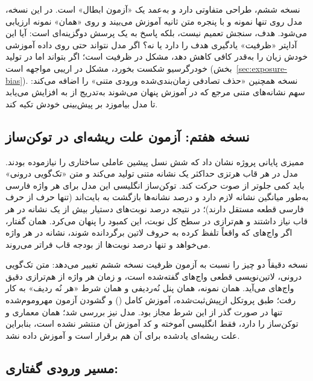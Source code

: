 نسخه ششم، طراحی متفاوتی دارد و به‌عمد یک «آزمون ابطال» است. در این
نسخه، مدل روی تنها  نمونه و با پنجره متن  ثانیه آموزش می‌بیند و روی «همان» 
نمونه ارزیابی می‌شود. هدف، سنجش تعمیم نیست، بلکه پاسخ به یک پرسش دو‌گزینه‌ای
است: آیا این آداپتر «ظرفیت» یادگیری هدف را دارد یا نه؟ اگر مدل
نتواند حتی روی داده آموزشی خودش زیان را به‌قدر کافی کاهش دهد، مشکل در
ظرفیت است؛ اگر بتواند اما در تولید خودرگرسیو شکست بخورد، مشکل در
اریبی مواجهه است (بخش~\ref{sec:exposure-bias}). نسخه  همچنین
«حذف تصادفی زمان‌بندی‌شده ورودی متنی» را اضافه می‌کند: سهم نشانه‌های
متنی مرجع که در آموزش پنهان می‌شوند به‌تدریج از  به 
افزایش می‌یابد تا مدل بیاموزد بر پیش‌بینی خودش تکیه کند.

\subsection{نسخه هفتم: آزمون علت ریشه‌ای در توکن‌ساز}
\label{sec:moshi-v7}

ممیزی پایانی پروژه نشان داد که شش نسل پیشین عاملی ساختاری را نیازموده بودند.
مدل  در هر قاب  هرتزی حداکثر یک نشانه متنی تولید می‌کند و
متن «تک‌گویی درونی» باید کمی جلوتر از صوت حرکت کند. توکن‌ساز انگلیسی
 این مدل برای هر واژه فارسی به‌طور میانگین  نشانه
لازم دارد و  درصد نشانه‌ها بازگشت به بایت‌اند (تنها  حرف از
 حرف فارسی قطعه مستقل دارند)؛ در نتیجه  درصد نوبت‌های دستیار
بیش از یک نشانه در هر قاب نیاز داشتند و هم‌ترازی در سطح کل نوبت، این کمبود
را پنهان می‌کرد. همان گفتار، اگر واج‌های  که 
واقعاً تلفظ کرده به حروف لاتین برگردانده شوند،  نشانه در هر واژه
می‌خواهد و تنها  درصد نوبت‌ها از بودجه قاب فراتر می‌روند.

نسخه  دقیقاً دو چیز را نسبت به آزمون ظرفیت نسخه ششم تغییر می‌دهد:
متن تک‌گویی درونی، لاتین‌نویسی قطعی واج‌های گفته‌شده است، و زمان هر واژه از
هم‌ترازی دقیق واج‌های  می‌آید. همان  نمونه، همان پنل نُه‌ردیفی
و همان شرط «هر نُه ردیف» به کار رفت؛ طبق پروتکل ازپیش‌ثبت‌شده، آموزش کامل
() و گشودن آزمون مهروموم‌شده تنها در صورت گذر از این شرط مجاز بود.
مدل  نیز بررسی شد؛ همان معماری و توکن‌ساز را دارد، فقط
انگلیسی آموخته و کد آموزش آن منتشر نشده است، بنابراین علت ریشه‌ای یادشده
برای آن هم برقرار است و آموزش داده نشد.

\subsection{مسیر ورودی گفتاری: }
\label{sec:speechin}

